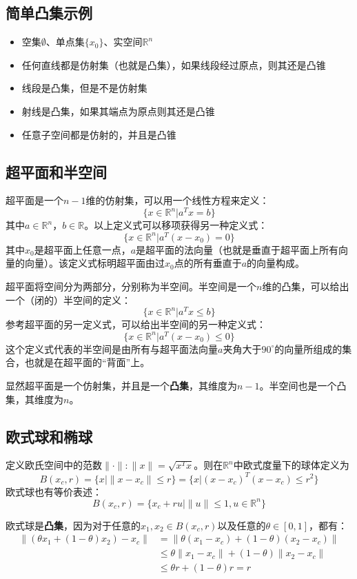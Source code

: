 \documentclass[12pt,a4paper]{book}
\begin{document}
\subsection{简单凸集示例}
\begin{itemize}
    \item 空集$\emptyset$、单点集$\{x_0\}$、实空间$\mathbb{R}^n$
    \item 任何直线都是仿射集（也就是凸集），如果线段经过原点，则其还是凸锥
    \item 线段是凸集，但是不是仿射集
    \item 射线是凸集，如果其端点为原点则其还是凸锥
    \item 任意子空间都是仿射的，并且是凸锥
\end{itemize}
\subsection{超平面和半空间}
超平面是一个$n-1$维的仿射集，可以用一个线性方程来定义：
$$\{x \in \mathbb{R}^n | a^Tx = b\}$$
其中$a \in \mathbb{R}^n$，$b \in \mathbb{R}$。以上定义式可以移项获得另一种定义式：
$$\{x \in \mathbb{R}^n | a^T(x - x_0) = 0\}$$
其中$x_0$是超平面上任意一点，$a$是超平面的法向量（也就是垂直于超平面上所有向量的向量）。该定义式标明超平面由过$x_0$点的所有垂直于$a$的向量构成。

超平面将空间分为两部分，分别称为半空间。半空间是一个$n$维的凸集，可以给出一个（闭的）半空间的定义：
$$\{x \in \mathbb{R}^n | a^Tx \leq b\}$$
参考超平面的另一定义式，可以给出半空间的另一种定义式：
$$\{x \in \mathbb{R}^n | a^T(x-x_0) \leq 0\}$$
这个定义式代表的半空间是由所有与超平面法向量$a$夹角大于$90^\circ$的向量所组成的集合，也就是在超平面的“背面”上。

显然超平面是一个仿射集，并且是一个\textbf{凸集}，其维度为$n-1$。半空间也是一个凸集，其维度为$n$。

\subsection{欧式球和椭球}

定义欧氏空间中的范数$\|\cdot\| : \|x\| = \sqrt{x^Tx}$。则在$\mathbb{R}^n$中欧式度量下的球体定义为
$$B(x_c,r)=\{x|\|x-x_c\|\leq r\} = \{x|(x-x_c)^T(x-x_c)\leq r^2\}$$
欧式球也有等价表述：
$$B(x_c,r)=\{x_c+ru|\|u\|\leq 1,u\in \mathbb{R}^n\}$$

欧式球是\textbf{凸集}，因为对于任意的$x_1,x_2 \in B(x_c,r)$以及任意的$\theta \in [0,1]$，都有：
\begin{align*}
\| (\theta x_1 + (1 - \theta)x_2) - x_c \| &= \| \theta (x_1 - x_c) + (1 - \theta)(x_2 - x_c) \| \\
&\leq \theta \| x_1 - x_c \| + (1 - \theta)\| x_2 - x_c \| \\
&\leq \theta r + (1 - \theta)r = r
\end{align*}
\end{document}
